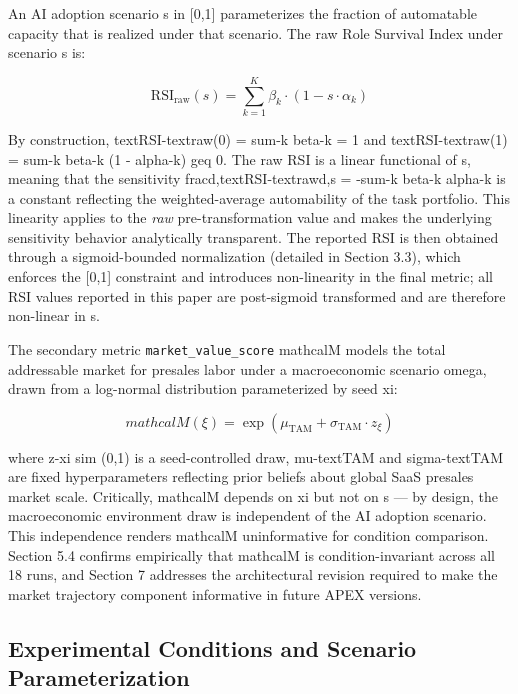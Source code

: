\documentclass[10pt, conference]{IEEEtran}
\begin{document}
An AI adoption scenario s in [0,1] parameterizes the fraction of automatable capacity that is realized under that scenario. The raw Role Survival Index under scenario s is:

\begin{equation}
\text{RSI}_{\text{raw}}(s) = \sum_{k=1}^{K} \beta_k \cdot \left(1 - s \cdot \alpha_k\right)
\end{equation}

By construction, textRSI-textraw(0) = sum-k beta-k = 1 and textRSI-textraw(1) = sum-k beta-k (1 - alpha-k) geq 0. The raw RSI is a linear functional of s, meaning that the sensitivity fracd,textRSI-textrawd,s = -sum-k beta-k alpha-k is a constant reflecting the weighted-average automability of the task portfolio. This linearity applies to the \textit{raw} pre-transformation value and makes the underlying sensitivity behavior analytically transparent. The reported RSI is then obtained through a sigmoid-bounded normalization (detailed in Section 3.3), which enforces the [0,1] constraint and introduces non-linearity in the final metric; all RSI values reported in this paper are post-sigmoid transformed and are therefore non-linear in s.

The secondary metric \texttt{market\_value\_score} mathcalM models the total addressable market for presales labor under a macroeconomic scenario omega, drawn from a log-normal distribution parameterized by seed xi:

\begin{equation}
mathcalM(\xi) = \exp\left(\mu_{\text{TAM}} + \sigma_{\text{TAM}} \cdot z_\xi\right)
\end{equation}

where z-xi sim (0,1) is a seed-controlled draw, mu-textTAM and sigma-textTAM are fixed hyperparameters reflecting prior beliefs about global SaaS presales market scale. Critically, mathcalM depends on xi but not on s --- by design, the macroeconomic environment draw is independent of the AI adoption scenario. This independence renders mathcalM uninformative for condition comparison. Section 5.4 confirms empirically that mathcalM is condition-invariant across all 18 runs, and Section 7 addresses the architectural revision required to make the market trajectory component informative in future APEX versions.

\subsection{Experimental Conditions and Scenario Parameterization}
\end{document}
